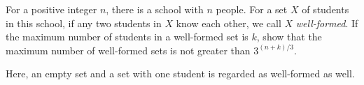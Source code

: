 For a positive integer $n$, there is a school with $n$ people. For a set $X$ of students in this school, if any two students in $X$ know each other, we call $X$ \textit{well-formed}. If the maximum number of students in a well-formed set is $k$, show that the maximum number of well-formed sets is not greater than $3^{(n+k)/3}$.

Here, an empty set and a set with one student is regarded as well-formed as well.